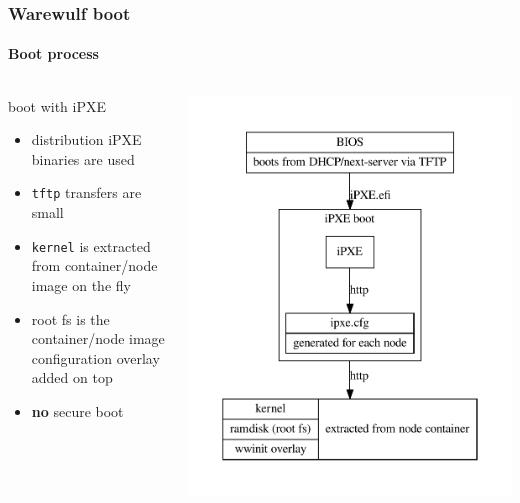 \documentclass[aspectratio=169]{beamer}
\begin{document}
\begin{frame}[fragile]
\frametitle{Warewulf boot}
\framesubtitle{Boot process}
\begin{columns}
\begin{block}{boot with iPXE}
\begin{itemize}
  \item distribution iPXE binaries are used
  \item \texttt{tftp} transfers are small
  \item \texttt{kernel} is extracted from container/node image on the fly
  \item root fs is the container/node image\\
  configuration overlay added on top
  \item \textbf{no} secure boot
\end{itemize}
\end{block}
\includegraphics[width=.9\linewidth]{ipxe_boot}
\end{columns}
\end{frame}
\end{document}
